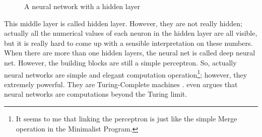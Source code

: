 \documentclass[final]{ua-thesis}
\numberwithin{equation}{section}
\begin{document}
\begin{figure}[h!]
\caption{A neural network with a hidden layer}
\centering
{}
\end{figure}    

This middle layer is called hidden layer. However, they are not really hidden; actually all the numerical values of each neuron in the hidden layer are all visible, but it is really hard to come up with a sensible interpretation on these numbers.  
When there are more than one hidden layers, the neural net is called deep neural net. However, the building blocks are still a simple perceptron. So, actually neural networks are simple and elegant computation operation\footnote{It seems to me that linking the perceptron is just like the simple Merge operation in the Minimalist Program.}; 
however, they extremely powerful. They are Turing-Complete machines \citep{siegelmann1991turing, graves2014neural}. \citet{siegelmann2003neural, siegelmann2012neural} even argues that neural networks are computations beyond the Turing limit. 
\end{document}
